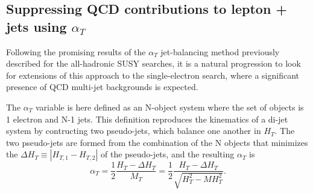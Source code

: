 \documentclass[12pt]{article}
\begin{document}
\newcommand{\met}{\mbox{$\raisebox{.3ex}{$\not$}E_T$\hspace*{0.5ex}}} 
\newcommand{\mpt}{\mbox{$\raisebox{.3ex}{$\not$}p_T$\hspace*{0.5ex}}} 

\subsection{Suppressing QCD contributions to lepton + jets using $\alpha_T$}

Following the promising results of the $\alpha_{T}$ jet-balancing method previously described for the all-hadronic SUSY searches, it is a natural progression to look for extensions of this approach to the single-electron search, where a significant presence of QCD multi-jet backgrounds is expected.

The $\alpha_{T}$ variable is here defined as an N-object system where the set of objects is 1 electron and N-1 jets. This definition reproduces the kinematics of a di-jet system by contructing two pseudo-jets, which balance one another in $H_{T}$. The two pseudo-jets are formed from the combination of the N objects that minimizes the $\Delta H_{T} \equiv |H_{T,1} - H_{T,2}|$ of the pseudo-jets, and the resulting  $\alpha_{T}$ is
\begin{equation}
\alpha_{T} = \frac{1}{2} \frac{H_{T} - \Delta H_{T}}{M_{T}} =  \frac{1}{2} \frac{H_{T} - \Delta H_{T}}{\sqrt{H_{T}^{2}-MH_{T}^{2}}}.
\end{equation}
\end{document}
